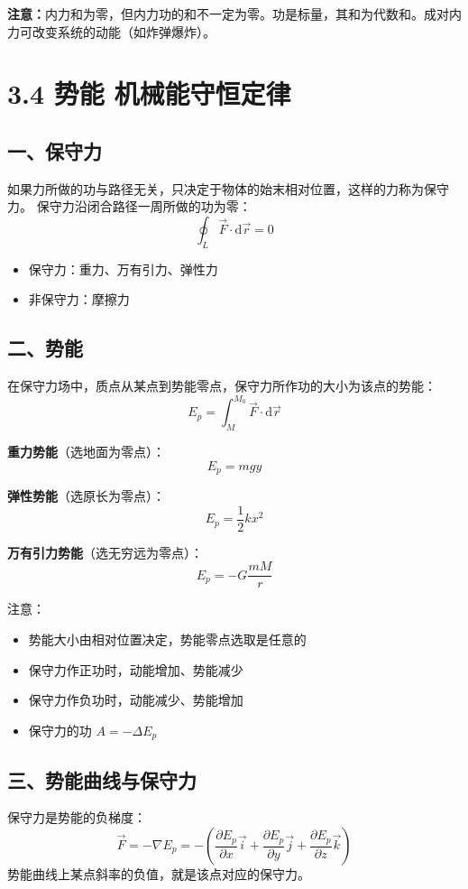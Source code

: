\documentclass{ctexart}
\begin{document}
\textbf{注意：}内力和为零，但内力功的和不一定为零。功是标量，其和为代数和。成对内力可改变系统的动能（如炸弹爆炸）。

\section*{3.4 势能 机械能守恒定律}

\subsection*{一、保守力}
如果力所做的功与路径无关，只决定于物体的始末相对位置，这样的力称为保守力。
保守力沿闭合路径一周所做的功为零：
\[
\oint_{L} \vec{F}\cdot\mathrm{d}\vec{r} = 0
\]
\begin{itemize}
  \item 保守力：重力、万有引力、弹性力
  \item 非保守力：摩擦力
\end{itemize}

\subsection*{二、势能}
在保守力场中，质点从某点到势能零点，保守力所作功的大小为该点的势能：
\[
E_p = \int_{M}^{M_0} \vec{F}\cdot\mathrm{d}\vec{r}
\]

\textbf{重力势能}（选地面为零点）：
\[
E_p = mgy
\]

\textbf{弹性势能}（选原长为零点）：
\[
E_p = \frac12 kx^{2}
\]

\textbf{万有引力势能}（选无穷远为零点）：
\[
E_p = -G\frac{mM}{r}
\]

注意：
\begin{itemize}
  \item 势能大小由相对位置决定，势能零点选取是任意的
  \item 保守力作正功时，动能增加、势能减少
  \item 保守力作负功时，动能减少、势能增加
  \item 保守力的功 $A = -\Delta E_p$
\end{itemize}

\subsection*{三、势能曲线与保守力}
保守力是势能的负梯度：
\[
\vec{F} = -\nabla E_p = -\left(\frac{\partial E_p}{\partial x}\vec{i} + \frac{\partial E_p}{\partial y}\vec{j} + \frac{\partial E_p}{\partial z}\vec{k}\right)
\]
势能曲线上某点斜率的负值，就是该点对应的保守力。
\end{document}
